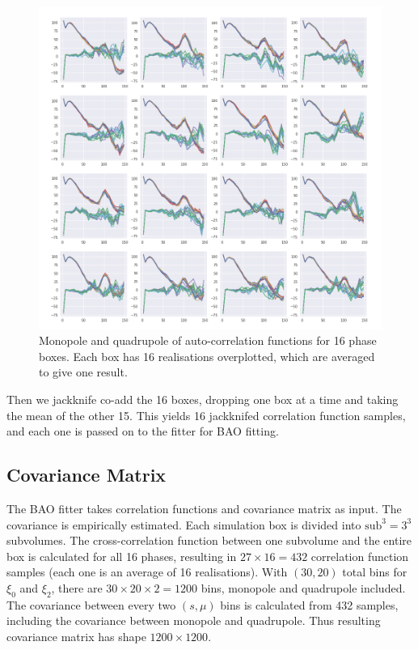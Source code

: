 \documentclass[fleqn,usenatbib]{mnras}
\begin{document}
		\begin{figure}
			\includegraphics[width=\linewidth]{xi_r10_phases_tinker13.png}
		    \caption{Monopole and quadrupole of auto-correlation functions for 16 phase boxes. Each box has 16 realisations overplotted, which are averaged to give one result.}
		    \label{fig:xi_r10_phases}
		\end{figure}
		
		Then we jackknife co-add the 16 boxes, dropping one box at a time and taking the mean of the other 15. This yields 16 jackknifed correlation function samples, and each one is passed on to the fitter for BAO fitting.

	\subsection{Covariance Matrix}
		
		The BAO fitter takes correlation functions and covariance matrix as input. The covariance is empirically estimated. Each simulation box is divided into $\text{sub}^3=3^3$ subvolumes. The cross-correlation function between one subvolume and the entire box is calculated for all 16 phases, resulting in $27 \times 16 = 432$ correlation function samples (each one is an average of 16 realisations). With $(30, 20)$ total bins for $\xi_0$ and $\xi_2$, there are $30\times 20 \times 2 = 1200$ bins, monopole and quadrupole included. The covariance between every two $(s,\mu)$ bins is calculated from 432 samples, including the covariance between monopole and quadrupole. Thus resulting covariance matrix has shape $1200\times 1200$.
		
\end{document}

